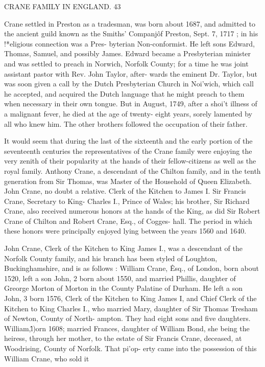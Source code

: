 \documentclass{book}
\begin{document}
CRANE FAMILY IN ENGLAND. 43 

Crane settled in Preston as a tradesman, was born about 1687, 
and admitted to the ancient guild known as the Smiths' Companj\^ 
of Preston, Sept. 7, 1717 ; in his !*eligious connection was a Pres- 
byterian Non-conformist. He left sons Edward, Thomas, Samuel, 
and possibly James. Edward became a Presbyterian minister 
and was settled to preach in Norwich, Norfolk County; for a 
time he was joint assistant pastor with Rev. John Taylor, after- 
wards the eminent Dr. Taylor, but was soon given a call by the 
Dutch Presbyterian Church in Noi'wich, which call he accepted, 
and acquired the Dutch language that he might preach to them 
when necessary in their own tongue. But in August, 1749, after 
a shoi't illness of a malignant fever, he died at the age of twenty- 
eight years, sorely lamented by all who knew him. The other 
brothers followed the occupation of their father. 

It would seem that during the last of the sixteenth and the 
early portion of the seventeenth centuries the representatives of 
the Crane family were enjoying the very zenith of their popularity 
at the hands of their fellow-citizens as well as the royal family. 
Anthony Crane, a descendant of the Chilton family, and in the 
tenth generation from Sir Thomas, was Master of the Household 
of Queen Elizabeth. John Crane, no doubt a relative. Clerk of 
the Kitchen to James I. Sir Francis Crane, Secretary to King- 
Charles I., Prince of Wales; his brother, Sir Richard Crane, 
also received numerous honors at the hands of the King, as did 
Sir Robert Crane of Chilton and Robert Crane, Esq., of Cogges- 
hall. The period in which these honors were principally enjoyed 
lying between the years 1560 and 1640. 

John Crane, Clerk of the Kitchen to King James I., was a 
descendant of the Norfolk County family, and his branch has 
been styled of Loughton, Buckinghamshire, and is as follows : 
William Crane, \^ Esq., of London, born about 1520, left a son 
John, 2 born about 1550, and married Phillis, daughter of Greorge 
Morton of Morton in the County Palatine of Durham. He left a 
son John, 3 born 1576, Clerk of the Kitchen to King James I, and 
Chief Clerk of the Kitchen to King Charles I., who married Mary, 
daughter of Sir Thomas Tresham of Newton, County of North- 
ampton. They had eight sons and five daughters. William,\^ 
l)orn 1608; married Frances, daughter of William Bond, she 
being the heiress, through her mother, to the estate of Sir Francis 
Crane, deceased, at Woodrising, County of Norfolk. That pi'op- 
erty came into the possession of this William Crane, who sold it 
\end{document}
